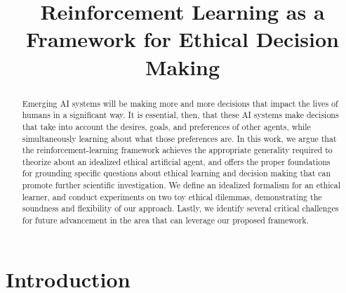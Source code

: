 \documentclass[11pt]{article}
\title{Reinforcement Learning as a Framework for Ethical Decision Making}
\author{}
\date{}                                           %
\begin{document}
\maketitle


\begin{abstract}
Emerging AI systems will be making more and more decisions that impact the lives of humans in a significant way. It is essential, then, that these AI systems make decisions that take into account the desires, goals, and preferences of other agents, while simultaneously learning about what those preferences are.
In this work, we argue that the reinforcement-learning framework achieves the appropriate generality required to theorize about an idealized ethical artificial agent, and offers the proper foundations for grounding specific questions about ethical learning and decision making that can promote further scientific investigation. We define an idealized formalism for an ethical learner, and conduct experiments on two toy ethical dilemmas, demonstrating the soundness and flexibility of our approach.
Lastly, we identify several critical challenges for future advancement in the area that can leverage our proposed framework.

\end{abstract}

\section{Introduction}
\end{document}
